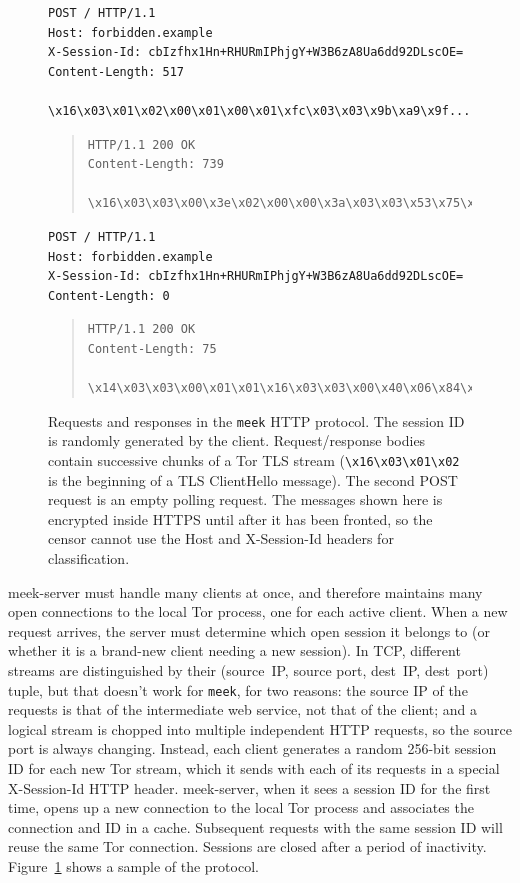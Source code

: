 \documentclass[conference]{IEEEtran}
\newcommand{\meekserver}{\mbox{meek-server}\xspace}
\newcommand{\meek}{\texttt{meek}\xspace}
\begin{document}
\begin{figure}
\scriptsize
\begin{verbatim}
POST / HTTP/1.1
Host: forbidden.example
X-Session-Id: cbIzfhx1Hn+RHURmIPhjgY+W3B6zA8Ua6dd92DLscOE=
Content-Length: 517

\x16\x03\x01\x02\x00\x01\x00\x01\xfc\x03\x03\x9b\xa9\x9f...
\end{verbatim}
\smallskip
\begin{quote}
\begin{verbatim}
HTTP/1.1 200 OK
Content-Length: 739

\x16\x03\x03\x00\x3e\x02\x00\x00\x3a\x03\x03\x53\x75\xa2...
\end{verbatim}
\end{quote}
\smallskip
\begin{verbatim}
POST / HTTP/1.1
Host: forbidden.example
X-Session-Id: cbIzfhx1Hn+RHURmIPhjgY+W3B6zA8Ua6dd92DLscOE=
Content-Length: 0

\end{verbatim}
\smallskip
\begin{quote}
\begin{verbatim}
HTTP/1.1 200 OK
Content-Length: 75

\x14\x03\x03\x00\x01\x01\x16\x03\x03\x00\x40\x06\x84\x25...
\end{verbatim}
\end{quote}
\caption{
Requests and responses in the \meek HTTP protocol.
The session ID is randomly generated by the client.
Request/response bodies contain successive chunks of a Tor TLS stream
(\texttt{\textbackslash{}x16\textbackslash{}x03\textbackslash{}x01\textbackslash{}x02}
is the beginning of a TLS ClientHello message).
The second POST request is an empty polling request.
The messages shown here is encrypted inside HTTPS until after
it has been fronted,
so the censor cannot use the
Host and X-Session-Id headers for classification.
}
\label{fig:protocol}
\end{figure}

\meekserver must handle many clients at once,
and therefore maintains many open connections to the local Tor process,
one for each active client.
When a new request arrives, the server must determine which
open session it belongs to
(or whether it is a brand-new client needing a new session).
In TCP, different streams are distinguished by their
(source~IP, source port, dest~IP, dest~port) tuple,
but that doesn't work for \meek, for two reasons:
the source IP of the requests is that of the intermediate web service,
not that of the client;
and a logical stream is chopped into multiple independent HTTP requests,
so the source port is always changing.
Instead, each client generates a random 256-bit session ID for each new Tor stream,
which it sends with each of its requests in a special
X-Session-Id HTTP header.
\meekserver, when it sees a session ID for the first time,
opens up a new connection to the local Tor process
and associates the connection and ID in a cache.
Subsequent requests with the
same session ID will reuse the same Tor connection.
Sessions are closed after a period of inactivity.
Figure~\ref{fig:protocol} shows a sample of the protocol.
\end{document}
